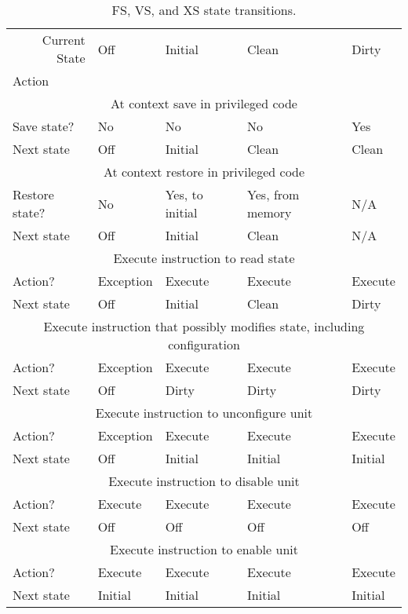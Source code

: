 \begin{table*}[h!]
\begin{center}
\begin{tabular}{|l|l|l|l|l|}
\hline
\multicolumn{1}{|r|}{Current State} & Off & Initial & Clean & Dirty \\
Action & & & &\\
\hline
\hline
\multicolumn{5}{|c|}{At context save in privileged code}\\
\hline
Save state?    & No         & No        & No     & Yes \\
Next state       & Off        & Initial   & Clean  & Clean \\
\hline
\hline
\multicolumn{5}{|c|}{At context restore in privileged code}\\
\hline
Restore state? & No        & Yes, to initial & Yes, from memory   & N/A \\
Next state     & Off       & Initial   & Clean  & N/A \\
\hline
\hline
\multicolumn{5}{|c|}{Execute instruction to read state}\\
\hline
Action?        & Exception & Execute   & Execute & Execute \\
Next state     & Off       & Initial   & Clean  & Dirty \\
\hline
\hline
\multicolumn{5}{|c|}{Execute instruction that possibly modifies state, including configuration}\\
\hline
Action?        & Exception & Execute & Execute & Execute \\
Next state     & Off       & Dirty   & Dirty  & Dirty \\
\hline
\hline
\multicolumn{5}{|c|}{Execute instruction to unconfigure unit}\\
\hline
Action?        & Exception & Execute & Execute & Execute \\
Next state     & Off       & Initial & Initial & Initial \\
\hline
\hline
\multicolumn{5}{|c|}{Execute instruction to disable unit}\\
\hline
Action?        & Execute   & Execute & Execute & Execute \\
Next state     & Off       & Off     & Off     & Off \\
\hline
\hline
\multicolumn{5}{|c|}{Execute instruction to enable unit}\\
\hline
Action?        & Execute   & Execute & Execute & Execute \\
Next state     & Initial   & Initial & Initial & Initial   \\
\hline
\end{tabular}
\end{center}
\caption{FS, VS, and XS state transitions.}
\label{fsxsstates}
\end{table*}


